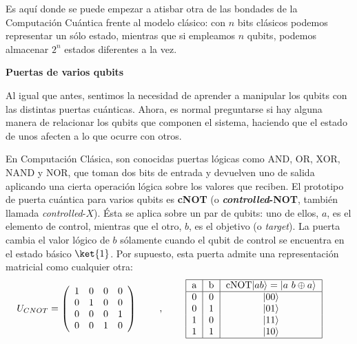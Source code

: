 \documentclass[11pt,a4paper,twoside,pdf]{article}
\numberwithin{equation}{section}
\begin{document}
		Es aquí donde se puede empezar a atisbar otra de las bondades de la Computación Cuántica frente al modelo clásico: con $n$ bits clásicos podemos representar un sólo estado, mientras que si empleamos $n$ qubits, podemos almacenar $2^n$ estados diferentes a la vez.
		
		\begin{flushleft}{\textbf{Puertas de varios qubits }}\end{flushleft}
		
			Al igual que antes, sentimos la necesidad de aprender a manipular los qubits con las distintas puertas cuánticas. Ahora, es normal preguntarse si hay alguna manera de relacionar los qubits que componen el sistema, haciendo que el estado de unos afecten a lo que ocurre con otros. 
		
			En Computación Clásica, son conocidas puertas lógicas como AND, OR, XOR, NAND y NOR, que toman dos bits de entrada y devuelven uno de salida aplicando una cierta operación lógica sobre los valores que reciben. El prototipo de puerta cuántica para varios qubits es \textbf{cNOT} (o \textbf{\textit{controlled}-NOT}, también llamada \textit{controlled}-$X$). Ésta se aplica sobre un par de qubits: uno de ellos, $a$, es el elemento de control, mientras que el otro, $b$, es el objetivo (o \textit{target}). La puerta cambia el valor lógico de $b$ sólamente cuando el qubit de control se encuentra en el estado básico $\ket{1}$. Por supuesto, esta puerta admite una representación matricial como cualquier otra:
				\begin{equation} \label{eq: CNOT}
					U_{CNOT} = \left(\begin{array}{cccc}
					1 & 0 & 0 & 0\\
					0 & 1 & 0 & 0\\
					0 & 0 & 0 & 1\\
					0 & 0 & 1 & 0
					\end{array}\right)										\qquad \;	,	\;\qquad
					\begin{tabular}{| c | c | c | }
							\hline
								a & b & cNOT$|ab\rangle=|a\ b\oplus a\rangle$ \\ \hline
								0 & 0 & $|00\rangle$ \\
								0 & 1 &  $|01\rangle$  \\
								1 & 0 &  $|11\rangle$ \\
								1 & 1 &  $|10\rangle$ \\ \hline
					\end{tabular}			\qquad
				\end{equation}
			
\end{document}
